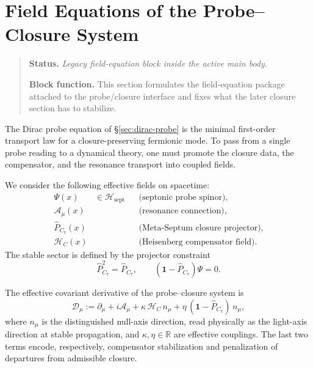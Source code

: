 
\section{Field Equations of the Probe--Closure System}
\begin{quote}\small
\noindent\textbf{Status.} \emph{Legacy field-equation block inside the active main body.}\par
\noindent\textbf{Block function.} This section formulates the field-equation package attached to the probe/closure interface and fixes what the later closure section has to stabilize.
\end{quote}
\label{sec:field-eq}

\begin{remark}
The Dirac probe equation of \S\ref{sec:dirac-probe} is the minimal
first-order transport law for a closure-preserving fermionic mode.
To pass from a single probe reading to a dynamical theory, one must
promote the closure data, the compensator, and the resonance transport
into coupled fields.
\end{remark}

\begin{definition}
We consider the following effective fields on spacetime:
\begin{align*}
 \Psi(x) &\in \mathcal H_{\mathrm{sept}}
 &&\text{(septonic probe spinor)},\\
 \mathcal A_\mu(x)
 &&&\text{(resonance connection)},\\
 \hat P_{C_7}(x)
 &&&\text{(Meta-Septum closure projector)},\\
 \mathcal H_C(x)
 &&&\text{(Heisenberg compensator field)}.
\end{align*}
The stable sector is defined by the projector constraint
\[
 \hat P_{C_7}^2 = \hat P_{C_7},
 \qquad
 (\mathbf 1-\hat P_{C_7})\Psi = 0.
\]
\end{definition}

\begin{definition}
The effective covariant derivative of the probe--closure system is
\[
 \mathcal D_\mu
 :=
 \partial_\mu
 + i\mathcal A_\mu
 + \kappa\,\mathcal H_C\,n_\mu
 + \eta\,(\mathbf 1-\hat P_{C_7})\,n_\mu,
\]
where $n_\mu$ is the distinguished null-axis direction, read physically as the light-axis direction at stable propagation, and
$\kappa,\eta\in\mathbb R$ are effective couplings.
The last two terms encode, respectively, compensator stabilization and
penalization of departures from admissible closure.
\end{definition}

